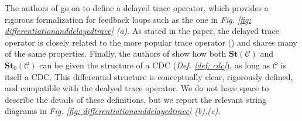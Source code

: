 \documentclass[11pt,a4paper,openright,twoside]{report}
\theoremstyle{plain}
\theoremstyle{definition}
\begin{document}
The authors of \cite{sprunger2019differentiable} go on to define a delayed trace operator, which provides a rigorous formalization for feedback loops such as the one in \textit{Fig. \ref{fig: differentiationanddelayedtrace} (a)}. As stated in the paper, the delayed trace operator is closely related to the more popular trace operator (\cite{joyal1996traced}) and shares many of the same properties. 
Finally, the authors of \cite{sprunger2019differentiable} show how both $\mathbf{St}(\mathcal{C})$ and $\mathbf{St}_0(\mathcal{C})$ can be given the structure of a CDC (\textit{Def. \ref{def: cdc}}), as long as $\mathcal{C}$ is itself a CDC. This differential structure is conceptually clear, rigorously defined, and compatible with the dealyed trace operator. We do not have space to describe the details of these definitions, but we report the relevant string diagrams in \textit{Fig. \ref{fig: differentiationanddelayedtrace} (b),(c)}.
\end{document}

